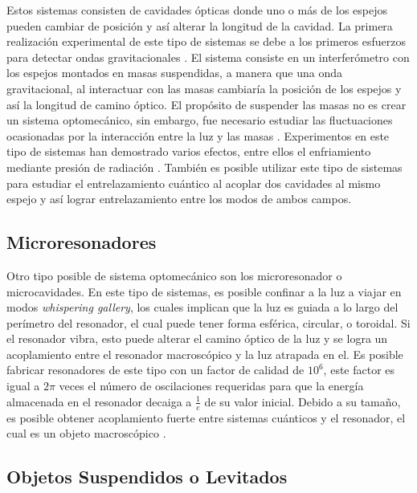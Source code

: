 \documentclass[10pt,a4paper]{report}
\begin{document}
Estos sistemas consisten de cavidades ópticas donde uno o más de los
espejos pueden cambiar de posición y así alterar la longitud de la
cavidad. La primera realización experimental de este tipo de sistemas
se debe a los primeros esfuerzos para detectar ondas gravitacionales
\cite{AbramoviciLIGO}. El sistema consiste en un interferómetro con
los espejos montados en masas suspendidas, a manera que una onda
gravitacional, al interactuar con las masas cambiaría la posición de
los espejos y así la longitud de camino óptico. El propósito de
suspender las masas no es  crear un sistema optomecánico, sin embargo, fue necesario estudiar las fluctuaciones ocasionadas por la interacción entre la luz y las masas \cite{CavesIF}.
Experimentos en este tipo de sistemas han demostrado varios efectos,
entre ellos el enfriamiento mediante presión de radiación
\cite{CorbittOC}. También es posible utilizar este tipo de sistemas
para estudiar el entrelazamiento cuántico\cite{ChenED} al acoplar dos
cavidades al mismo espejo y así lograr entrelazamiento entre los modos
de ambos campos.

\subsection{Microresonadores}

Otro tipo posible de sistema optomecánico son los
microresonador o microcavidades. En este tipo de sistemas, es posible
confinar a la luz a viajar en modos \textit{whispering gallery}, los
cuales implican que la luz es guiada a lo largo del perímetro del
resonador, el cual puede tener forma esférica, circular, o
toroidal\cite{VahalaOM}. Si el resonador vibra, esto puede alterar el camino óptico de la luz y
se logra un acoplamiento entre el resonador macroscópico y la luz atrapada en el. Es posible fabricar resonadores de este
tipo con un factor de calidad de $10^6$, este factor es igual a $2\pi$ veces el número de oscilaciones requeridas para que la energía almacenada en el resonador decaiga a $\frac{1}{e}$ de su valor inicial. Debido a su tamaño, es
posible obtener acoplamiento fuerte entre sistemas cuánticos y el
resonador, el cual es un objeto macroscópico \cite{VerhagenMOC}.

\subsection{Objetos Suspendidos o Levitados}
\end{document}
